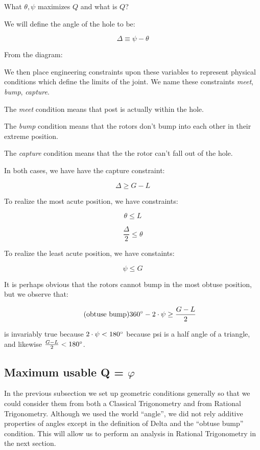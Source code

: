 \documentclass[11pt]{article}
\begin{document}
\bigskip

What $\theta, \psi$ maximizes $Q$ and what is $Q$?

\bigskip

We will define the angle of the hole to be:

\[\tag{Delta Defintition} \Delta \equiv \psi - \theta \]

From the diagram:


We then place engineering constraints upon these variables to represent physical conditions
which define the limits of the joint.
We name these constraints \textit{meet}, \textit{bump}, \textit{capture}.

The \textit{meet} condition means that post is actually within the hole.

The \textit{bump} condition means that the rotors don't bump into each other
in their extreme position.

The \textit{capture} condition means that the the rotor can't fall out of the hole.

In both cases, we have have the capture constraint:

\[ \tag{capture} \Delta \geq G - L \]

To realize the most acute position, we have constraints:

\[ \tag{acute meet} \theta \leq L \]

\[ \tag{acute bump} \frac{\Delta}{2} \leq \theta  \]

To realize the least acute position, we have constaints:

\[ \tag{obtuse meet}  \psi \leq G \]

It is perhaps obvious that the rotors cannot bump in the most obtuse position, but we observe that:

\[ \tag{obtuse bump} 360\degree - 2\cdot \psi \geq \frac{G - L}{2} \]

is invariably true because $2\cdot\psi < 180\degree$ because psi is a half angle of a triangle, and likewise $\frac{G - L}{2} < 180\degree$.

\subsection{Maximum usable Q = $\varphi$}

In the previous subsection we set up geometric conditions generally so that we could consider them from
both a Classical Trigonometry and from Rational Trigonometry.  Although we used the world ``angle'', we did not
rely additive properties of angles except in the definition of Delta and the ``obtuse bump'' condition.  This will allow us
to perform an analysis in Rational Trigonometry in the next section.
\end{document}
